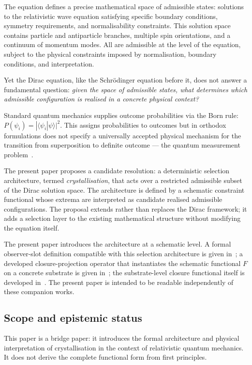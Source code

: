 \documentclass[12pt]{article}
\begin{document}
The equation defines a precise mathematical space of admissible states: solutions to the relativistic wave equation satisfying specific boundary conditions, symmetry requirements, and normalisability constraints. This solution space contains particle and antiparticle branches, multiple spin orientations, and a continuum of momentum modes. All are admissible at the level of the equation, subject to the physical constraints imposed by normalisation, boundary conditions, and interpretation.

Yet the Dirac equation, like the Schr\"odinger equation before it, does not answer a fundamental question: \textit{given the space of admissible states, what determines which admissible configuration is realised in a concrete physical context?}

Standard quantum mechanics supplies outcome probabilities via the Born rule: $P(\psi_i) = |\langle\psi_i|\psi\rangle|^2$. This assigns probabilities to outcomes but in orthodox formulations does not specify a universally accepted physical mechanism for the transition from superposition to definite outcome --- the quantum measurement problem~\citep{Schlosshauer2005}.

The present paper proposes a candidate resolution: a deterministic selection architecture, termed \textit{crystallisation}, that acts over a restricted admissible subset of the Dirac solution space. The architecture is defined by a schematic constraint functional whose extrema are interpreted as candidate realised admissible configurations. The proposal extends rather than replaces the Dirac framework; it adds a selection layer to the existing mathematical structure without modifying the equation itself.

The present paper introduces the architecture at a schematic level. A formal observer-slot definition compatible with this selection architecture is given in~\citep{SmartXXIX}; a developed closure-projection operator that instantiates the schematic functional $F$ on a concrete substrate is given in~\citep{SmartXXXIII}; the substrate-level closure functional itself is developed in~\citep{SmartXXXVI}. The present paper is intended to be readable independently of these companion works.

\subsection*{Scope and epistemic status}

This paper is a bridge paper: it introduces the formal architecture and physical interpretation of crystallisation in the context of relativistic quantum mechanics. It does not derive the complete functional form from first principles.
\end{document}
